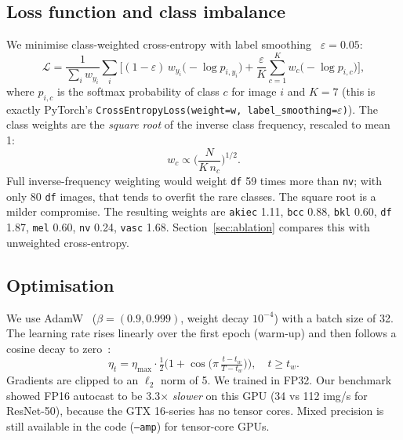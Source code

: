 \subsection{Loss function and class imbalance}
We minimise class-weighted cross-entropy with label smoothing~\cite{labelsmoothing} $\varepsilon = 0.05$:
\begin{equation}
\mathcal{L} = \frac{1}{\sum_i w_{y_i}}\sum_{i}\Big[(1-\varepsilon)\,w_{y_i}\big(-\log p_{i,y_i}\big)
 + \frac{\varepsilon}{K}\sum_{c=1}^{K} w_c\big(-\log p_{i,c}\big)\Big],
\end{equation}
where $p_{i,c}$ is the softmax probability of class $c$ for image $i$ and $K=7$ (this is exactly PyTorch's
\texttt{CrossEntropyLoss(weight=w, label\_smoothing=$\varepsilon$)}). The class weights are the \emph{square root} of the
inverse class frequency, rescaled to mean 1:
\begin{equation}
w_c \propto \Big(\frac{N}{K\,n_c}\Big)^{1/2}.
\end{equation}
Full inverse-frequency weighting would weight \texttt{df} 59 times more than \texttt{nv}; with only 80
\texttt{df} images, that tends to overfit the rare classes. The square root is a milder compromise. The
resulting weights are
\texttt{akiec} 1.11, \texttt{bcc} 0.88, \texttt{bkl} 0.60, \texttt{df} 1.87, \texttt{mel} 0.60,
\texttt{nv} 0.24, \texttt{vasc} 1.68. Section~\ref{sec:ablation} compares this with unweighted cross-entropy.

\subsection{Optimisation}
We use AdamW~\cite{adamw} ($\beta=(0.9, 0.999)$, weight decay $10^{-4}$) with a batch size of 32. The learning
rate rises linearly over the first epoch (warm-up) and then follows a cosine decay to zero~\cite{sgdr}:
\begin{equation}
\eta_t = \eta_{\max}\cdot \tfrac12\Big(1+\cos\big(\pi\,\tfrac{t - t_w}{T - t_w}\big)\Big), \quad t \ge t_w .
\end{equation}
Gradients are clipped to an $\ell_2$ norm of 5. We trained in FP32. Our benchmark showed FP16 autocast to be
3.3$\times$ \emph{slower} on this GPU (34 vs 112 img/s for ResNet-50), because the GTX 16-series has no tensor
cores. Mixed precision is still available in the code (\texttt{--amp}) for tensor-core GPUs.

